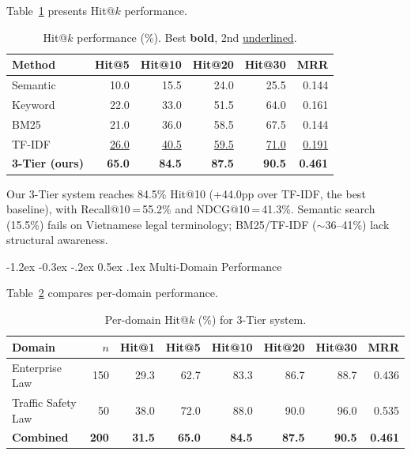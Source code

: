 \documentclass{IOS-Book-Article}
\makeatletter
\renewcommand\subsection{\@startsection{subsection}{2}{\z@}%
  {-1.2ex \@plus -0.3ex \@minus -.2ex}%
  {0.5ex \@plus .1ex}%
  {\normalfont\normalsize\bfseries}}
\makeatother
\begin{document}
Table~\ref{tab:main-results} presents Hit@$k$ performance.

\begin{table}[H]
\centering\footnotesize
\caption{Hit@$k$ performance (\%). Best \textbf{bold}, 2nd \underline{underlined}.}
\label{tab:main-results}
\begin{tabular}{l@{\hskip 3pt}r@{\hskip 3pt}r@{\hskip 3pt}r@{\hskip 3pt}r@{\hskip 3pt}r}
\toprule
\textbf{Method} & \textbf{Hit@5} & \textbf{Hit@10} & \textbf{Hit@20} & \textbf{Hit@30} & \textbf{MRR} \\
\midrule
Semantic & 10.0 & 15.5 & 24.0 & 25.5 & 0.144 \\
Keyword & 22.0 & 33.0 & 51.5 & 64.0 & 0.161 \\
BM25 & 21.0 & 36.0 & 58.5 & 67.5 & 0.144 \\
TF-IDF & \underline{26.0} & \underline{40.5} & \underline{59.5} & \underline{71.0} & \underline{0.191} \\
\textbf{3-Tier (ours)} & \textbf{65.0} & \textbf{84.5} & \textbf{87.5} & \textbf{90.5} & \textbf{0.461} \\
\bottomrule
\end{tabular}
\end{table}

Our 3-Tier system reaches 84.5\% Hit@10 (+44.0pp over TF-IDF, the best baseline), with Recall@10\,=\,55.2\% and NDCG@10\,=\,41.3\%. Semantic search (15.5\%) fails on Vietnamese legal terminology; BM25/TF-IDF ($\sim$36--41\%) lack structural awareness.

\subsection{Multi-Domain Performance}

Table~\ref{tab:domain-results} compares per-domain performance.

\begin{table}[H]
\centering\footnotesize
\caption{Per-domain Hit@$k$ (\%) for 3-Tier system.}
\label{tab:domain-results}
\begin{tabular}{lrrrrrrr}
\toprule
\textbf{Domain} & \textbf{$n$} & \textbf{Hit@1} & \textbf{Hit@5} & \textbf{Hit@10} & \textbf{Hit@20} & \textbf{Hit@30} & \textbf{MRR} \\
\midrule
Enterprise Law & 150 & 29.3 & 62.7 & 83.3 & 86.7 & 88.7 & 0.436 \\
Traffic Safety Law & 50 & 38.0 & 72.0 & 88.0 & 90.0 & 96.0 & 0.535 \\
\midrule
\textbf{Combined} & \textbf{200} & \textbf{31.5} & \textbf{65.0} & \textbf{84.5} & \textbf{87.5} & \textbf{90.5} & \textbf{0.461} \\
\bottomrule
\end{tabular}
\end{table}
\end{document}
